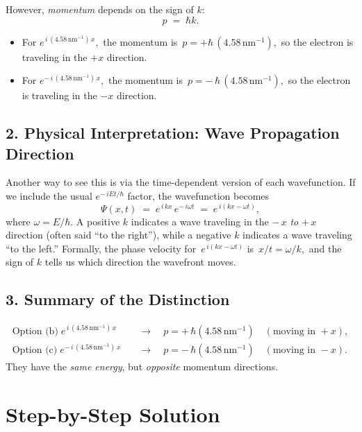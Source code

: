 \documentclass[12pt]{article}
\theoremstyle{definition} %
\theoremstyle{plain} %
\begin{document}
However, \emph{momentum} depends on the sign of $k$:
\[
p \;=\; \hbar k.
\]
\begin{itemize}
\item For \(\displaystyle e^{\,i\,(4.58\,\mathrm{nm}^{-1})\,x},\) 
  the momentum is 
  \(\,p = +\hbar\,(4.58\,\mathrm{nm}^{-1}),\)
  so the electron is traveling in the $+x$ direction.
\item For \(\displaystyle e^{-\,i\,(4.58\,\mathrm{nm}^{-1})\,x},\)
  the momentum is 
  \(\,p = -\,\hbar\,(4.58\,\mathrm{nm}^{-1}),\)
  so the electron is traveling in the $-x$ direction.
\end{itemize}

\subsection*{2. Physical Interpretation: Wave Propagation Direction}

Another way to see this is via the time-dependent version of each wavefunction. 
If we include the usual $e^{-\,i E t / \hbar}$ factor, the wavefunction becomes
\[
\Psi(x,t) 
\;=\; e^{\,i\,kx}\,e^{-\,i \omega t}
\;=\;
e^{\,i(k x - \omega t)},
\]
where $\omega = E/\hbar$. 
A positive $k$ indicates a wave traveling in the $-\,x$ \emph{to} $+\,x$ direction (often said ``to the right''), 
while a negative $k$ indicates a wave traveling ``to the left.''  
Formally, the phase velocity for 
\(\,e^{\,i(kx - \omega t)}\)
is $\,x/t = \omega/k,$ and the sign of $k$ tells us which direction the wavefront moves.

\subsection*{3. Summary of the Distinction}

\[
\boxed{
\begin{aligned}
\text{Option (b)}\;e^{\,i\,(4.58\,\mathrm{nm}^{-1})\,x} 
&\quad\rightarrow\quad
p = +\,\hbar(4.58\,\mathrm{nm}^{-1}) \quad(\text{moving in }+x),\\[6pt]
\text{Option (c)}\;e^{-\,i\,(4.58\,\mathrm{nm}^{-1})\,x}
&\quad\rightarrow\quad
p = -\,\hbar(4.58\,\mathrm{nm}^{-1}) \quad(\text{moving in }-x).
\end{aligned}
}
\]
They have the \emph{same energy}, but \emph{opposite} momentum directions.


\section*{Step-by-Step Solution}
\end{document}
